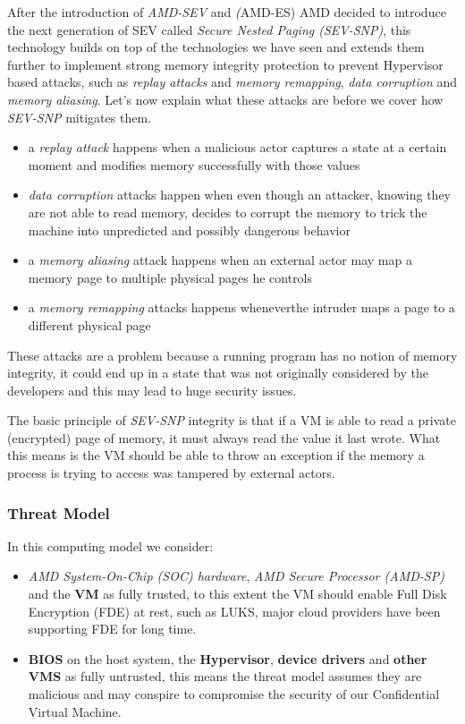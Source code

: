 \documentclass[twocolumn]{article}
\begin{document}
After the introduction of \textit{AMD-SEV} and \textit(AMD-ES) AMD decided to introduce the next generation of SEV called \textit{Secure Nested Paging (SEV-SNP)}, this technology builds on top of the technologies we have seen and extends them further to implement strong memory integrity protection to prevent Hypervisor based attacks, such as \textit{replay attacks} and \textit{memory remapping}, \textit{data corruption} and \textit{memory aliasing}.
Let's now explain what these attacks are before we cover how \textit{SEV-SNP} mitigates them.

\begin{itemize}
    \item a \textit{replay attack} happens when a malicious actor captures a state at a certain moment and modifies memory successfully with those values
    \item \textit{data corruption} attacks happen when even though an attacker, knowing they are not able to read memory, decides to corrupt the memory to trick the machine into unpredicted and possibly dangerous behavior
    \item a \textit{memory aliasing} attack happens when an external actor may map a memory page to multiple physical pages he controls
    \item a \textit{memory remapping} attacks happens wheneverthe intruder maps a page to a different physical page
\end{itemize}

These attacks are a problem because a running program has no notion of memory integrity, it could end up in a state that was not originally considered by the developers and this may lead to huge security issues.

The basic principle of \textit{SEV-SNP} integrity is that if a VM is able to read a private (encrypted) page of memory, it must always read the value it last wrote. What this means is the VM should be able to throw an exception if the memory a process is trying to access was tampered by external actors.

\subsubsection{Threat Model}
In this computing model we consider:
\begin{itemize}
    \item \textit{AMD System-On-Chip (SOC) hardware}, \textit{AMD Secure Processor (AMD-SP)} and the \textbf{VM} as fully trusted, to this extent the VM should enable Full Disk Encryption (FDE) at rest, such as LUKS, major cloud providers have been supporting FDE for long time.
    \item \textbf{BIOS} on the host system, the \textbf{Hypervisor}, \textbf{device drivers} and \textbf{other VMS} as fully untrusted, this means the threat model assumes they are malicious and may conspire to compromise the security of our Confidential Virtual Machine.
\end{itemize}
\end{document}
